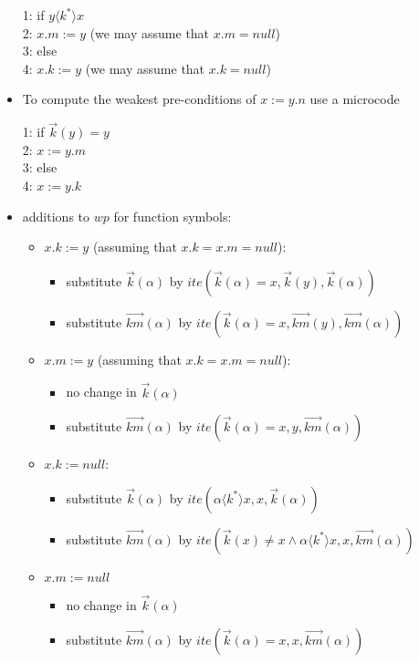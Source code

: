 \documentclass[11pt,a4paper,oneside,draft]{article}
\theoremstyle{definition}
\theoremstyle{remark}
\newcommand{\tup}[1]{{\langle #1 \rangle}}
\begin{document}
\begin{itemize}
1: if  $y \tup{k^*} x$ \\
2: \qquad $x.m := y$   (we may assume that $x.m = null$)\\
3: else \\
4: \qquad $x.k := y$ (we may assume that $x.k = null$)\\


\item To compute the weakest pre-conditions of $x := y.n$ use a microcode

1: if  $\vec{k}(y) = y$ \\
2: \qquad $x := y.m$ \\
3: else \\
4: \qquad $x := y.k$


\item additions to $wp$ for function symbols:

\begin{itemize}
\item $x.k := y$ (assuming that $x.k = x.m = null$):
\begin{itemize}
\item substitute $\vec{k}(\alpha)$ by $ite(\vec{k}(\alpha)=x, \vec{k}(y), \vec{k}(\alpha))$
\item substitute $\vec{km}(\alpha)$ by $ite(\vec{k}(\alpha)=x, \vec{km}(y), \vec{km}(\alpha))$
\end{itemize}
\item $x.m := y$ (assuming that $x.k = x.m = null$):
\begin{itemize}
\item no change in $\vec{k}(\alpha)$
\item substitute $\vec{km}(\alpha)$ by $ite(\vec{k}(\alpha)=x, y, \vec{km}(\alpha))$
\end{itemize}
\item $x.k := null$:
\begin{itemize}
\item substitute $\vec{k}(\alpha)$ by $ite(\alpha \tup{k^*} x, x, \vec{k}(\alpha))$
\item substitute $\vec{km}(\alpha)$ by $ite(\vec{k}(x)\neq x \land \alpha \tup{k^*} x, x,\vec{km}(\alpha))$
\end{itemize}
\item $x.m := null$
\begin{itemize}
\item no change in $\vec{k}(\alpha)$
\item substitute $\vec{km}(\alpha)$ by $ite(\vec{k}(\alpha)=x , x, \vec{km}(\alpha))$
\end{itemize}

\end{itemize}




\end{itemize}
\end{document}
